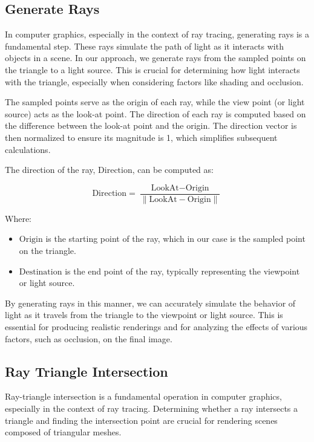 \documentclass[11pt, a4paper,oneside,chapterprefix=false]{scrbook}
\begin{document}
\subsection{Generate Rays}

In computer graphics, especially in the context of ray tracing, generating rays is a fundamental step. These rays simulate the path of light as it interacts with objects in a scene. In our approach, we generate rays from the sampled points on the triangle to a light source. This is crucial for determining how light interacts with the triangle, especially when considering factors like shading and occlusion.

The sampled points serve as the origin of each ray, while the view point (or light source) acts as the look-at point. The direction of each ray is computed based on the difference between the look-at point and the origin. The direction vector is then normalized to ensure its magnitude is 1, which simplifies subsequent calculations.

The direction of the ray, \( \text{Direction} \), can be computed as:

\begin{equation}
	\text{Direction} = \frac{\text{LookAt} - \text{Origin}}{\|\text{LookAt} - \text{Origin}\|}
\end{equation}

Where:
\begin{itemize}
    \item \(\text{Origin}\) is the starting point of the ray, which in our case is the sampled point on the triangle.
    \item \(\text{Destination}\) is the end point of the ray, typically representing the viewpoint or light source.
\end{itemize}

By generating rays in this manner, we can accurately simulate the behavior of light as it travels from the triangle to the viewpoint or light source. This is essential for producing realistic renderings and for analyzing the effects of various factors, such as occlusion, on the final image.


\subsection{Ray Triangle Intersection}

Ray-triangle intersection is a fundamental operation in computer graphics, especially in the context of ray tracing. Determining whether a ray intersects a triangle and finding the intersection point are crucial for rendering scenes composed of triangular meshes.
\end{document}
